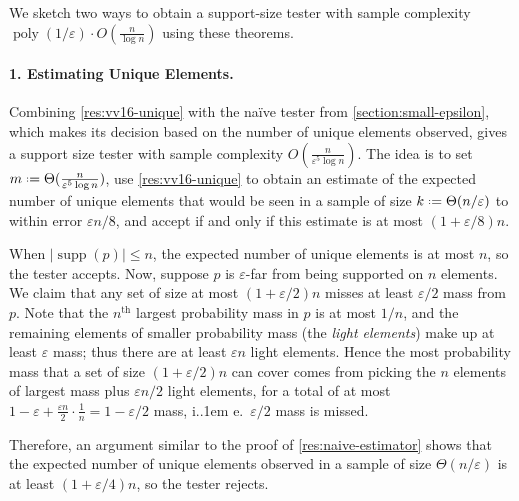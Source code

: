 \documentclass{theoretics}
\newcommand*\ie{i.\kern.1em e.\ }
\newcommand{\ignore}[1]{}
\DeclareMathOperator{\supp}{supp}   %
\DeclareMathOperator{\poly}{poly}
\newcommand{\Ex}[1]{\bE \left[ #1 \right]}
\newcommand*{\define}{\mathrel{\vcenter{\baselineskip0.5ex \lineskiplimit0pt
                      \hbox{\scriptsize.}\hbox{\scriptsize.}}}%
                      =}
\newcommand{\ind}[1]{\mathds{1} \left[ #1 \right] }
\newcommand{\bE}{\ensuremath{\mathbb{E}}}
\newcommand{\bN}{\ensuremath{\mathbb{N}}}
\renewcommand{\epsilon}{\varepsilon}
\begin{document}
We sketch two ways to obtain a support-size tester with sample complexity $\poly(1/\epsilon) \cdot
O(\tfrac{n}{\log n})$ using these theorems.

\paragraph*{1. Estimating Unique Elements.} Combining \cref{res:vv16-unique} with
the na\"ive tester from \cref{section:small-epsilon}, which makes its decision based on the number of
unique elements observed, gives a support size tester with sample complexity $O(\frac{n}{\epsilon^5
\log n})$. The idea is to set $m \define \Theta(\frac{n}{\epsilon^5 \log n})$, use
\cref{res:vv16-unique} to obtain an estimate of the expected number of unique elements that would be
seen in a sample of size $k \define \Theta(n/\epsilon)$ to within error $\epsilon n / 8$, and accept
if and only if this estimate is at most $(1 + \epsilon/8) n$.

When $|\supp(p)| \le n$, the expected number of unique elements is at most $n$, so the tester
accepts. Now, suppose $p$ is $\epsilon$-far from being supported on $n$ elements. We claim that any
set of size at most $(1 + \epsilon/2) n$ misses at least $\epsilon / 2$ mass from $p$. Note that the
$n^{\text{th}}$ largest probability mass in $p$ is at most $1/n$, and the remaining elements of
smaller probability mass (the \emph{light elements}) make up at least $\epsilon$ mass; thus there
are at least $\epsilon n$ light elements. Hence the most probability mass that a set of size
$(1+\epsilon/2) n$ can cover comes from picking the $n$ elements of largest mass plus $\epsilon n /
2$ light elements, for a total of at most $1 - \epsilon + \frac{\epsilon n}{2} \cdot \frac{1}{n} = 1
- \epsilon/2$ mass, \ie $\epsilon/2$ mass is missed.

Therefore, an argument similar to the proof of \cref{res:naive-estimator} shows that the expected
number of unique elements observed in a sample of size $\Theta(n/\epsilon)$ is at least $(1 +
\epsilon/4) n$, so the tester rejects.

\ignore{
\footnote{Let $\bm{X}_i$ indicate whether a new unique element was observed in
    the $i^{\text{th}}$ step, let $\bm{S}_i \define \sum_{j \le i} \bm{X}_i$ be the number of unique
    elements seen in the first $i$ steps, and let $\bm{Y}_i \define \ind{\bm{S}_{i-1} \ge
    (1+\epsilon/2)n \text{ or } \bm{X}_i = 1}$. Then for any $m \in \bN$, $\bm{S}_m \ge
    (1+\epsilon/2)n$ if and only if $\sum_{i \le m} \bm{Y}_i \ge (1+\epsilon/2)n$. Moreover, for any
    setting of $(\bm{Y}_j)_{j<i} = (y_j)_{j<i}$, the conditioned random variable $\bm{Y}_i \,|\,
    (\bm{Y}_j)_{j<i} = (y_j)_{j<i}$ stochastically dominates a Bernoulli random variable with
    parameter $\epsilon/2$ (because either $(1+\epsilon/2)n$ unique elements have been observed, or
    the unseen elements make up at least $\epsilon/2$ mass). Hence a Chernoff bound implies that,
    for $k = \Theta(n/\epsilon)$, $\sum_{i \le k} \bm{Y}_i \ge 2n$ with probability at least $1 -
e^{-\Omega(n)}$. Therefore $\Ex{\bm{S}_k} \ge (1 - e^{-\Omega(n)}) (1+\epsilon/2) n > (1+\epsilon/4)
n$.}
}
\end{document}
